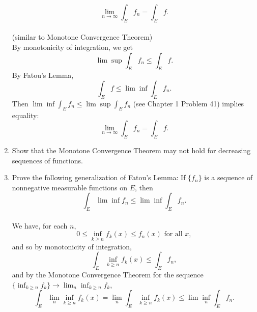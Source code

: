 \begin{enumerate}
    \[
        \lim_{n\to\infty}\int_Ef_n=\int_Ef.
    \]
    \\(similar to Monotone Convergence Theorem)
    \\By monotonicity of integration, we get
    \[
        \lim\sup\int_Ef_n\le \int_Ef.
    \]
    By Fatou's Lemma,
    \[
        \int_Ef\le\lim\inf\int_Ef_n.     
    \]
    Then $\lim\inf\int_Ef_n\le\lim\sup\int_Ef_n$ (see Chapter 1 Problem 41) implies equality:
    \[
        \lim_{n\to\infty}\int_Ef_n=\int_Ef.
    \]
    \item Show that the Monotone Convergence Theorem may not hold for decreasing sequences of functions.
    \item Prove the following generalization of Fatou's Lemma: If $\{f_n\}$ is a sequence of nonnegative measurable functions on $E$, then 
    \[
        \int_E\lim\inf f_n\le\lim\inf\int_Ef_n.     
    \]
    \\We have, for each $n$,
    \[
        0\le\inf_{k\ge n} f_k(x)\le f_n(x)\text{ for all }x,
    \]
    and so by monotonicity of integration,
    \[
    \int_E\inf_{k\ge n} f_k(x)\le\int_Ef_n,
    \]
    and by the Monotone Convergence Theorem for the sequence $\{\inf_{k\ge n} f_k\}\to\lim_n\inf_{k\ge n} f_k$,
    \[
    \int_E\lim_n\inf_{k\ge n} f_k(x)=\lim_n\int_E\inf_{k\ge n} f_k(x)\le\lim\inf_n\int_Ef_n.
    \]
\end{enumerate}
    
